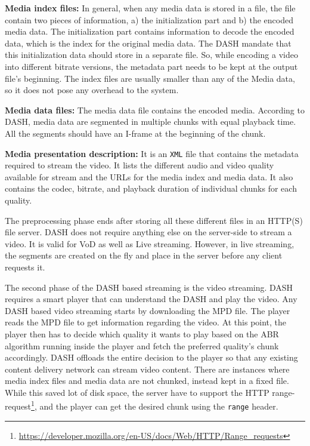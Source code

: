 {\bf Media index files:} In general, when any media data is stored in a file, the file contain two pieces of information, a) the initialization part and b) the encoded media data. The initialization part contains information to decode the encoded data, which is the index for the original media data. The DASH mandate that this initialization data should store in a separate file. So, while encoding a video into different bitrate versions, the metadata part needs to be kept at the output file's beginning. The index files are usually smaller than any of the Media data, so it does not pose any overhead to the system.

{\bf Media data files:} The media data file contains the encoded media. According to DASH, media data are segmented in multiple chunks with equal playback time. All the segments should have an I-frame at the beginning of the chunk.

{\bf Media presentation description:} It is an {\tt XML} file that contains the metadata required to stream the video. It lists the different audio and video quality available for stream and the URLs for the media index and media data. It also contains the codec, bitrate, and playback duration of individual chunks for each quality.

The preprocessing phase ends after storing all these different files in an HTTP(S) file server. DASH does not require anything else on the server-side to stream a video. It is valid for VoD as well as Live streaming. However, in live streaming, the segments are created on the fly and place in the server before any client requests it.

The second phase of the DASH based streaming is the video streaming. DASH requires a smart player that can understand the DASH and play the video. Any DASH based video streaming starts by downloading the MPD file. The player reads the MPD file to get information regarding the video.  At this point, the player then has to decide which quality it wants to play based on the ABR algorithm running inside the player and fetch the preferred quality's chunk accordingly. DASH offloads the entire decision to the player so that any existing content delivery network can stream video content. There are instances where media index files and media data are not chunked, instead kept in a fixed file. While this saved lot of disk space, the server have to support the HTTP range-request\footnote{\url{https://developer.mozilla.org/en-US/docs/Web/HTTP/Range_requests}}, and the player can get the desired chunk using the {\tt range} header.

